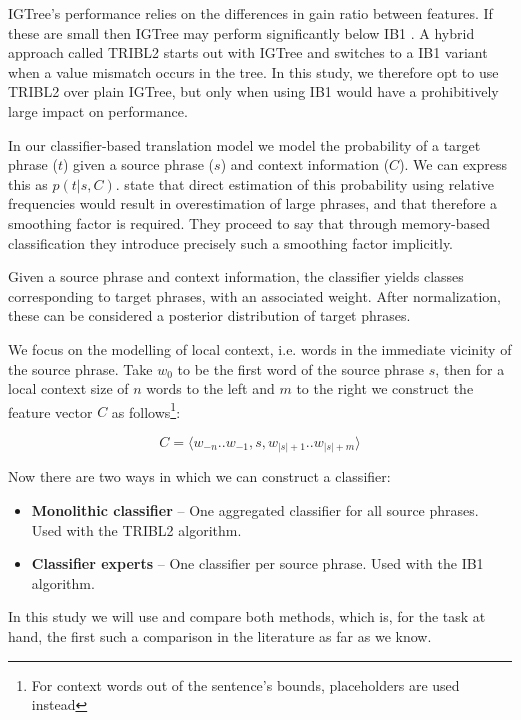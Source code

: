 IGTree's performance relies on the differences in gain ratio between
features. If these are small then IGTree may perform significantly below IB1
\citep{TIMBL}. A hybrid approach called TRIBL2 \citep{TIMBL} starts out with
IGTree and switches to a IB1 variant when a value mismatch occurs in the tree.
In this study, we therefore opt to use TRIBL2 over plain IGTree, but only when
using IB1 would have a prohibitively large impact on performance.

In our classifier-based translation model we model the probability
of a target phrase ($t$) given a source phrase ($s$) and context information
($C$). We can express this as $p(t|s,C)$.  \cite{Stroppa+07} state that
direct estimation of this probability using relative frequencies would result
in overestimation of large phrases, and that therefore a smoothing factor is
required. They proceed to say that through memory-based classification they
introduce precisely such a smoothing factor implicitly.

Given a source phrase and context information, the classifier yields classes
corresponding to target phrases, with an associated weight. After
normalization, these can be considered a posterior distribution of
target phrases. 

We focus on the modelling of local context, i.e. words in the
immediate vicinity of the source phrase. Take $w_0$ to be the first word of
the source phrase $s$, then for a local context size of $n$ words to the left and
$m$ to the right we construct the feature vector $C$ as
follows\footnote{For context words out of the sentence's bounds, placeholders
are used instead}:

\begin{equation}
  C = \langle w_{-n} .. w_{-1} , s , w_{|s|+1} .. w_{|s|+m} \rangle
\end{equation}

Now there are two ways in which we can construct a classifier:

\begin{itemize}
  \item \textbf{Monolithic classifier} -- One aggregated classifier for all
    source phrases. Used with the TRIBL2 algorithm.
  \item \textbf{Classifier experts} -- One classifier per source phrase. Used
      with the IB1 algorithm.
\end{itemize}

In this study we will use and compare both methods, which is, for the task at
hand, the first such a comparison in the literature as far as we know.

